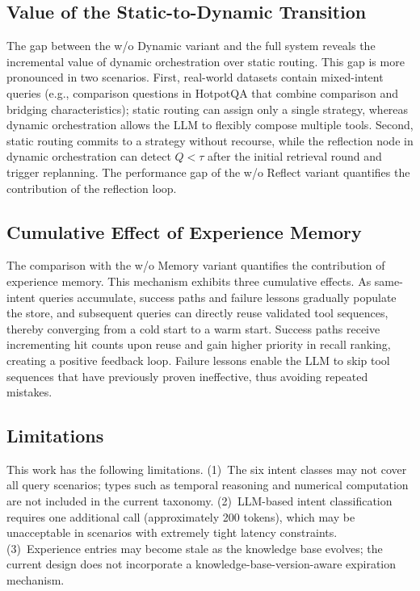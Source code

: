 \documentclass[runningheads]{llncs}
\begin{document}
\subsection{Value of the Static-to-Dynamic Transition}

The gap between the w/o Dynamic variant and the full system reveals the incremental value of dynamic orchestration over static routing. This gap is more pronounced in two scenarios. First, real-world datasets contain mixed-intent queries (e.g., comparison questions in HotpotQA that combine comparison and bridging characteristics); static routing can assign only a single strategy, whereas dynamic orchestration allows the LLM to flexibly compose multiple tools. Second, static routing commits to a strategy without recourse, while the reflection node in dynamic orchestration can detect $Q < \tau$ after the initial retrieval round and trigger replanning. The performance gap of the w/o Reflect variant quantifies the contribution of the reflection loop.

\subsection{Cumulative Effect of Experience Memory}

The comparison with the w/o Memory variant quantifies the contribution of experience memory. This mechanism exhibits three cumulative effects. As same-intent queries accumulate, success paths and failure lessons gradually populate the store, and subsequent queries can directly reuse validated tool sequences, thereby converging from a cold start to a warm start. Success paths receive incrementing hit counts upon reuse and gain higher priority in recall ranking, creating a positive feedback loop. Failure lessons enable the LLM to skip tool sequences that have previously proven ineffective, thus avoiding repeated mistakes.

\subsection{Limitations}

This work has the following limitations. (1)~The six intent classes may not cover all query scenarios; types such as temporal reasoning and numerical computation are not included in the current taxonomy. (2)~LLM-based intent classification requires one additional call (approximately 200 tokens), which may be unacceptable in scenarios with extremely tight latency constraints. (3)~Experience entries may become stale as the knowledge base evolves; the current design does not incorporate a knowledge-base-version-aware expiration mechanism.
\end{document}
